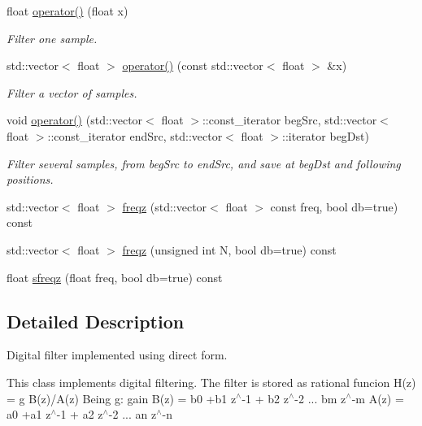 \begin{DoxyCompactItemize}
float \hyperlink{classupc_1_1DigitalFilter_a8d8f578b514a2dd58a545a68fdf441ee}{operator()} (float x)
\begin{DoxyCompactList}\small\item\em Filter one sample. \end{DoxyCompactList}\item 
\mbox{\label{classupc_1_1DigitalFilter_aea8cdd6504cf9c4ae1a6d9a28e1bcaa4}} 
std\+::vector$<$ float $>$ \hyperlink{classupc_1_1DigitalFilter_aea8cdd6504cf9c4ae1a6d9a28e1bcaa4}{operator()} (const std\+::vector$<$ float $>$ \&x)
\begin{DoxyCompactList}\small\item\em Filter a vector of samples. \end{DoxyCompactList}\item 
\mbox{\label{classupc_1_1DigitalFilter_a08b53e2a3884053f4a48d6860194cccb}} 
void \hyperlink{classupc_1_1DigitalFilter_a08b53e2a3884053f4a48d6860194cccb}{operator()} (std\+::vector$<$ float $>$\+::const\+\_\+iterator beg\+Src, std\+::vector$<$ float $>$\+::const\+\_\+iterator end\+Src, std\+::vector$<$ float $>$\+::iterator beg\+Dst)
\begin{DoxyCompactList}\small\item\em Filter several samples, from beg\+Src to end\+Src, and save at beg\+Dst and following positions. \end{DoxyCompactList}\item 
std\+::vector$<$ float $>$ \hyperlink{classupc_1_1DigitalFilter_a03537f0f0604b772f8f6ee3cc08f194e}{freqz} (std\+::vector$<$ float $>$ const freq, bool db=true) const
\item 
std\+::vector$<$ float $>$ \hyperlink{classupc_1_1DigitalFilter_aaccd48246b8f0154725d40d43ae52268}{freqz} (unsigned int N, bool db=true) const
\item 
float \hyperlink{classupc_1_1DigitalFilter_aee8d8470871b79ff465459ad0bedd833}{sfreqz} (float freq, bool db=true) const
\end{DoxyCompactItemize}


\subsection{Detailed Description}
Digital filter implemented using direct form. 

This class implements digital filtering. The filter is stored as rational funcion H(z) = g B(z)/A(z) Being g\+: gain B(z) = b0 +b1 z$^\wedge$-\/1 + b2 z$^\wedge$-\/2 ... bm z$^\wedge$-\/m A(z) = a0 +a1 z$^\wedge$-\/1 + a2 z$^\wedge$-\/2 ... an z$^\wedge$-\/n

